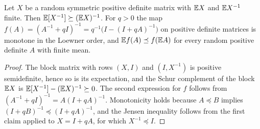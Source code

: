 \begin{lemma}\label{lem:lrn-jensen}
Let $X$ be a random symmetric positive definite matrix with $\mathbb{E} X$ and $\mathbb{E} X^{-1}$ finite. Then $\mathbb{E}[X^{-1}]\succeq(\mathbb{E} X)^{-1}$. For $q>0$ the map $f(A)=(A^{-1}+qI)^{-1}=q^{-1}\bigl(I-(I+qA)^{-1}\bigr)$ on positive definite matrices is monotone in the Loewner order, and $\mathbb{E} f(A)\preceq f(\mathbb{E} A)$ for every random positive definite $A$ with finite mean.
\end{lemma}

\begin{proof}
The block matrix with rows $(X,I)$ and $(I,X^{-1})$ is positive semidefinite, hence so is its expectation, and the Schur complement of the block $\mathbb{E} X$ is $\mathbb{E}[X^{-1}]-(\mathbb{E} X)^{-1}\succeq0$. The second expression for $f$ follows from $(A^{-1}+qI)^{-1}=A(I+qA)^{-1}$. Monotonicity holds because $A\preceq B$ implies $(I+qB)^{-1}\preceq(I+qA)^{-1}$, and the Jensen inequality follows from the first claim applied to $X=I+qA$, for which $X^{-1}\preceq I$.
\end{proof}

